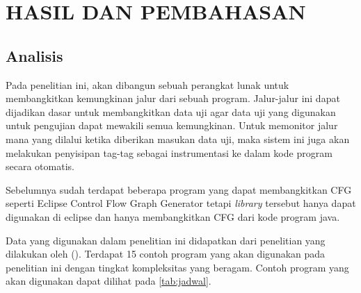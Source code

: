 \section*{HASIL DAN PEMBAHASAN}

\subsection*{Analisis}
Pada penelitian ini, akan dibangun sebuah perangkat lunak untuk membangkitkan kemungkinan jalur dari sebuah program. Jalur-jalur ini dapat dijadikan dasar untuk membangkitkan data uji agar data uji yang digunakan untuk pengujian dapat mewakili semua kemungkinan. Untuk memonitor jalur mana yang dilalui ketika diberikan masukan data uji, maka sistem ini juga akan melakukan penyisipan tag-tag sebagai instrumentasi ke dalam kode program secara otomatis.

Sebelumnya sudah terdapat beberapa program yang dapat membangkitkan CFG seperti Eclipse  Control Flow Graph Generator tetapi \textit{library} tersebut hanya dapat digunakan di eclipse dan hanya membangkitkan CFG dari kode program java. 

Data yang digunakan dalam penelitian ini didapatkan dari penelitian yang dilakukan oleh \citeauthor{HERMADI2015} (\cite*{HERMADI2015}). Terdapat 15 contoh program yang akan digunakan pada penelitian ini dengan tingkat kompleksitas yang beragam. Contoh program yang akan digunakan dapat dilihat pada \ref{tab:jadwal}.
 
